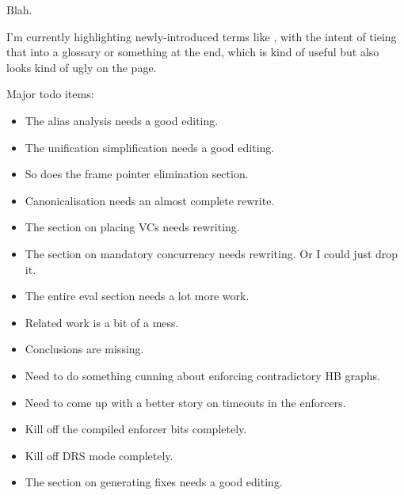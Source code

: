Blah.

I'm currently highlighting newly-introduced terms
like , with the intent of tieing that into a
glossary or something at the end, which is kind of useful but also
looks kind of ugly on the page.


Major todo items:

\begin{itemize}
\item The alias analysis needs a good editing.
\item The unification simplification needs a good editing.
\item So does the frame pointer elimination section.
\item Canonicalisation needs an almost complete rewrite.
\item The section on placing VCs needs rewriting.
\item The section on mandatory concurrency needs rewriting.  Or I could
   just drop it.
\item The entire eval section needs a lot more work.
\item Related work is a bit of a mess.
\item Conclusions are missing.
\item Need to do something cunning about enforcing contradictory HB graphs.
\item Need to come up with a better story on timeouts in the enforcers.
\item Kill off the compiled enforcer bits completely.
\item Kill off DRS mode completely.
\item The section on generating fixes needs a good editing.
\end{itemize}
